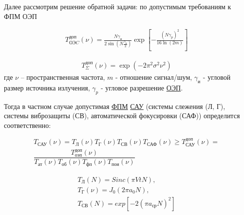 Далее рассмотрим решение обратной задачи: по  допустимым требованиям к  ФПМ ОЭП 









\begin{equation}
\label{eq:p2:3}
\begin{alignedat}{2}
T_{\textit{ОЭC}}^{\textit{доп}}\left(\nu{}\right)=
\frac{N{\gamma{}}_\textit{и}}{2\sin{\left(N\frac{{\gamma{}}_\textit{и}}{2}\right)}}
\exp{\left[-\frac{{\left(N{\gamma{}}_p\right)}^2}{16\ln{\left(2m\right)}}\right]}
\end{alignedat}
\end{equation}

\begin{equation}
\label{eq:p2:4}
\begin{alignedat}{2}
T_{\Sigma{}}^{\textit{доп}}\left(\nu\right)=\exp{\left(-2{\pi{}}^2{\sigma{}}^2\nu^2\right)}
\end{alignedat}
\end{equation}
где 
$\nu$ – пространственная частота, 
$m$ - отношение сигнал/шум, 
$\gamma_\textit{и}$ - угловой размер источника излучения, 
$\gamma_\textit{p}$ - угловое разрешение \hyperref[acroEOS]{ОЭП}. 

Тогда в частном случае допустимая \hyperref[acroFPM]{ФПМ} \hyperref[acroSAU]{САУ} (системы слежения (Л, Г), системы виброзащиты (СВ), автоматической фокусировки (САФ)) определится соответственно: 

\begin{equation}
\label{eq:p2:6}
\begin{alignedat}{2}
T_{\textit{САУ}}\left(\nu\right)=
T_\textit{Л}\left(\nu\right)T_\textit{Г}\left(\nu\right)T_{\textit{СВ}}\left(\nu\right)T_{\textit{САФ}}\left(\nu\right)\geq{}T_{\textit{САУ}}^{\textit{доп}}(\nu)= \\
\dfrac{ T_{\textit{оэп}}^{\textit{доп}}(\nu) }{ T_{\textit{ат}}(\nu)T_{\textit{об}}(\nu)T_{\textit{фп}}(\nu)T_{\textit{пои}}(\nu) }
\end{alignedat}
\end{equation}

\begin{equation}
\label{eq:p2:7}
\begin{alignedat}{3}
T_\textit{Л}\left(N\right)=Sinc(\pi{}VtN) , \\
T_{\textit{Г}}(\nu)=J_0\left(2\pi{}a_0N\right) , \\
T_{\textit{СВ}}\left(N\right) = exp[-2{(\pi{}a_{\textit{ср}}N)}^2]
\end{alignedat}
\end{equation}

